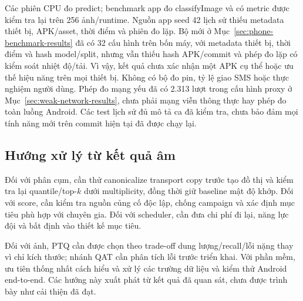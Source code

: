 Các phiên CPU đo predict; benchmark app đo classifyImage và có metric được kiểm tra lại trên 256 ảnh/runtime. Nguồn app seed 42 lịch sử thiếu metadata thiết bị, APK/asset, thời điểm và phiên đo lặp. Bộ mới ở Mục~\ref{sec:phone-benchmark-results} đã có 32 cấu hình trên bốn máy, với metadata thiết bị, thời điểm và hash model/split, nhưng vẫn thiếu hash APK/commit và phép đo lặp có kiểm soát nhiệt độ/tải. Vì vậy, kết quả chưa xác nhận một APK cụ thể hoặc ưu thế hiệu năng trên mọi thiết bị. Không có bộ đo pin, tỷ lệ giao SMS hoặc thực nghiệm người dùng. Phép đo mạng yếu đã có 2.313 lượt trong cấu hình proxy ở Mục~\ref{sec:weak-network-results}, chưa phải mạng viễn thông thực hay phép đo toàn luồng Android. Các test lịch sử đủ mô tả ca đã kiểm tra, chưa bảo đảm mọi tính năng mới trên commit hiện tại đã được chạy lại.

\subsection{Hướng xử lý từ kết quả âm}
Đối với phân cụm, cần thử canonicalize transport copy trước tạo đồ thị và kiểm tra lại quantile/top-$k$ dưới multiplicity, đồng thời giữ baseline mật độ khớp. Đối với score, cần kiểm tra nguồn củng cố độc lập, chống campaign và xác định mục tiêu phù hợp với chuyên gia. Đối với scheduler, cần đưa chi phí đi lại, năng lực đội và bất định vào thiết kế mục tiêu.

Đối với ảnh, PTQ cần được chọn theo trade-off dung lượng/recall/lỗi nặng thay vì chỉ kích thước; nhánh QAT cần phân tích lỗi trước triển khai. Với phần mềm, ưu tiên thống nhất cách hiểu và xử lý các trường dữ liệu và kiểm thử Android end-to-end. Các hướng này xuất phát từ kết quả đã quan sát, chưa được trình bày như cải thiện đã đạt.

